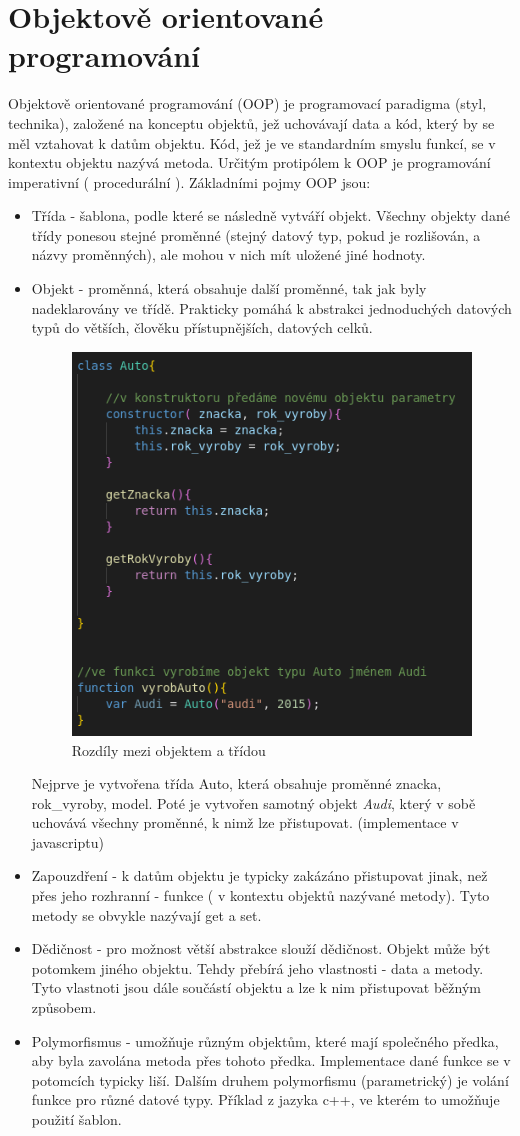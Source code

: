 \documentclass[main.tex]{subfiles}
\begin{document}
\section{Objektově orientované programování}
\label{oop}
Objektově orientované programování (OOP) je programovací paradigma (styl, technika), založené na konceptu objektů, jež uchovávají data a kód, který by se měl vztahovat k datům objektu. Kód, jež je ve standardním smyslu funkcí, se v kontextu objektu nazývá metoda. Určitým protipólem k OOP je programování imperativní ( procedurální ). Základními pojmy OOP jsou:
\begin{itemize}
    \item Třída - šablona, podle které se následně vytváří objekt. Všechny objekty dané třídy ponesou stejné proměnné (stejný datový typ, pokud je rozlišován, a názvy proměnných), ale mohou v nich mít uložené jiné hodnoty. 
	\item Objekt - proměnná, která obsahuje další proměnné, tak jak byly nadeklarovány ve třídě. Prakticky pomáhá k abstrakci jednoduchých datových typů do větších, člověku přístupnějších, datových celků.
		\begin{figure}[h]
			\centering
			\includegraphics[width=.6\textwidth]{./images/oop/class_audi.png}
			\caption{Rozdíly mezi objektem a třídou}
		\end{figure}
		Nejprve je vytvořena třída Auto, která obsahuje proměnné znacka, rok\_vyroby, model. Poté je vytvořen samotný objekt \textit{Audi}, který v sobě uchovává všechny proměnné, k nimž lze přistupovat. (implementace v javascriptu)
    \item Zapouzdření - k datům objektu je typicky zakázáno přistupovat jinak, než přes jeho rozhranní - funkce ( v kontextu objektů nazývané metody). Tyto metody se obvykle nazývají get a set.
	\item Dědičnost - pro možnost větší abstrakce slouží dědičnost. Objekt může být potomkem jiného objektu. Tehdy přebírá jeho vlastnosti - data a metody. Tyto vlastnoti jsou dále součástí objektu a lze k nim přistupovat běžným způsobem.
	\item Polymorfismus - umožňuje různým objektům, které mají společného předka, aby byla zavolána metoda přes tohoto předka. Implementace dané funkce se v potomcích typicky liší.
		Dalším druhem polymorfismu (parametrický) je volání funkce pro různé datové typy. Příklad z jazyka c++, ve kterém to umožňuje použití šablon.
	\cite{web:wik:en:oop}
\end{itemize}
\end{document}
